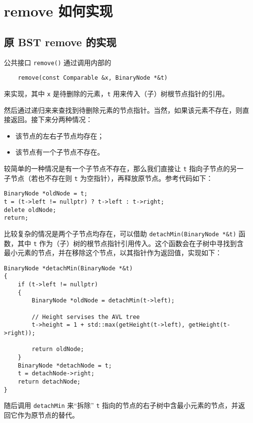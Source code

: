 \documentclass[UTF8]{ctexart}
\begin{document}
\section{remove 如何实现}

\subsection{原 BST remove 的实现}
公共接口 \verb|remove()| 通过调用内部的

\begin{verbatim}
    remove(const Comparable &x, BinaryNode *&t)
\end{verbatim}

来实现，其中 \verb|x| 是待删除的元素，\verb|t| 用来传入（子）树根节点指针的引用。

然后通过递归来来查找到待删除元素的节点指针。当然，如果该元素不存在，则直接返回。接下来分两种情况：

\begin{itemize}
    \item 该节点的左右子节点均存在；
    \item 该节点有一个子节点不存在。
\end{itemize}

较简单的一种情况是有一个子节点不存在，那么我们直接让 \verb|t| 指向子节点的另一子节点（若也不存在则 \verb|t| 为空指针），再释放原节点。参考代码如下：

\begin{lstlisting}
BinaryNode *oldNode = t;
t = (t->left != nullptr) ? t->left : t->right;
delete oldNode;
return;
\end{lstlisting}

比较复杂的情况是两个子节点均存在，可以借助 \verb|detachMin(BinaryNode *&t)| 函数，其中 \verb|t| 作为（子）树的根节点指针引用传入。这个函数会在子树中寻找到含最小元素的节点，并在移除这个节点，以其指针作为返回值，实现如下：

\begin{lstlisting}
BinaryNode *detachMin(BinaryNode *&t)
{
    if (t->left != nullptr)
    {
        BinaryNode *oldNode = detachMin(t->left);

        // Height servises the AVL tree
        t->height = 1 + std::max(getHeight(t->left), getHeight(t->right)); 

        return oldNode;
    }
    BinaryNode *detachNode = t;
    t = detachNode->right;
    return detachNode;
}
\end{lstlisting}

随后调用 \verb|detachMin| 来“拆除” \verb|t| 指向的节点的右子树中含最小元素的节点，并返回它作为原节点的替代。
\end{document}
